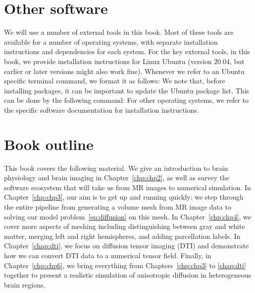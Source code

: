 \section{Other software}
We will use a number of external tools in this book. Most of these
tools are available for a number of operating systems, with separate
installation instructions and dependencies for each system. For the
key external tools, in this book, we provide installation instructions for Linux
Ubuntu (version 20.04, but earlier or later versions might also work
fine). Whenever we refer to an Ubuntu specific terminal command, we
format it as follows:
\noindent We note that, before installing packages, it can be important to update
the Ubuntu package list. This can be done by the following command:
\noindent For other operating systems, we refer to the specific
software documentation for installation instructions.

\section{Book outline}

This book covers the following material. We give an
introduction to brain physiology and brain imaging in
Chapter~\ref{chp:chp2}, as well as survey the software ecosystem
that will take us from MR images to numerical
simulation. In Chapter~\ref{chp:chp3}, our aim is to get up and
running quickly: we step through the entire pipeline from generating a
volume mesh from MR image data to solving our model
problem~\eqref{eq:diffusion} on this mesh. In Chapter~\ref{chp:chp4},
we cover more aspects of meshing including distinguishing between gray and
white matter, merging left and right hemispheres, and adding
parcellation labels. In Chapter~\ref{chap:dti}, we focus on diffusion
tensor imaging (DTI) and demonstrate how we can convert DTI data
to a numerical tensor field. Finally, in Chapter~\ref{chp:chp6}, we
bring everything from Chapters~\ref{chp:chp3} to \ref{chap:dti} together
to present a realistic simulation of anisotropic diffusion in
heterogeneous brain regions. 
 
